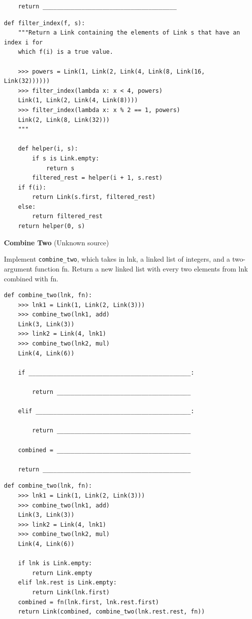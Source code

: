 \documentclass{exam}
\newlength{\currentparskip}
\newenvironment{blocksection}
{
    \setlength{\currentparskip}{\parskip}%
    \begin{minipage}{\linewidth}
    \setlength{\parskip}{\currentparskip}%
}
{
    \end{minipage}
}
\begin{document}
\begin{questions}
\begin{blocksection}
\begin{lstlisting}
    return ______________________________________
\end{lstlisting}
\end{blocksection}
\begin{solution}
\begin{lstlisting}
def filter_index(f, s):
    """Return a Link containing the elements of Link s that have an index i for
    which f(i) is a true value.
    
    >>> powers = Link(1, Link(2, Link(4, Link(8, Link(16, Link(32))))))
    >>> filter_index(lambda x: x < 4, powers)
    Link(1, Link(2, Link(4, Link(8))))
    >>> filter_index(lambda x: x % 2 == 1, powers)
    Link(2, Link(8, Link(32)))
    """
    
    def helper(i, s):
        if s is Link.empty:
            return s
        filtered_rest = helper(i + 1, s.rest)
    if f(i):
        return Link(s.first, filtered_rest)
    else:
        return filtered_rest
    return helper(0, s)
\end{lstlisting}
\end{solution}

\begin{blocksection}
\question \textbf{Combine Two} (Unknown source)

    Implement \lstinline{combine_two}, which takes in lnk, a linked list of integers, and a two-argument function fn. Return a new linked list with every two elements from lnk combined with fn.
\begin{lstlisting}
def combine_two(lnk, fn):
    >>> lnk1 = Link(1, Link(2, Link(3)))
    >>> combine_two(lnk1, add)
    Link(3, Link(3))
    >>> link2 = Link(4, lnk1)
    >>> combine_two(lnk2, mul)
    Link(4, Link(6))

    if ______________________________________________:

        return ______________________________________

    elif ____________________________________________:

        return ______________________________________
        
    combined = ______________________________________

    return __________________________________________
\end{lstlisting}
\end{blocksection}
\begin{solution}
\begin{lstlisting}
def combine_two(lnk, fn):
    >>> lnk1 = Link(1, Link(2, Link(3)))
    >>> combine_two(lnk1, add)
    Link(3, Link(3))
    >>> link2 = Link(4, lnk1)
    >>> combine_two(lnk2, mul)
    Link(4, Link(6))

    if lnk is Link.empty:
        return Link.empty
    elif lnk.rest is Link.empty:
        return Link(lnk.first)
    combined = fn(lnk.first, lnk.rest.first)
    return Link(combined, combine_two(lnk.rest.rest, fn))
\end{lstlisting}
\end{solution}
\end{questions}
\end{document}
